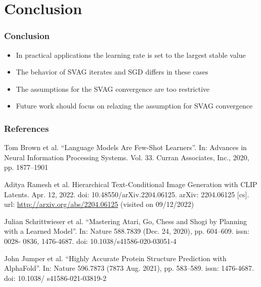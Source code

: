 \documentclass[aspectratio=1610,10pt,ucs]{beamer} %
\begin{document}
\section{Conclusion}
\begin{frame}
  \frametitle{Conclusion}
  \begin{itemize}
    \item In practical applications the learning rate is set to the largest stable value
    \item The behavior of SVAG iterates and SGD differs in these cases
    \item The assumptions for the SVAG convergence are too restrictive
    \item Future work should focus on relaxing the assumption for SVAG convergence
  \end{itemize}
\end{frame}
\begin{frame}
  \frametitle{References}
  
  \begin{thebibliography}{}
  Tom Brown et al. “Language Models Are Few-Shot Learners”. In: Advances in
  Neural Information Processing Systems. Vol. 33. Curran Associates, Inc., 2020,
  pp. 1877–1901

  Aditya Ramesh et al. Hierarchical Text-Conditional Image Generation with CLIP
  Latents. Apr. 12, 2022. doi: 10.48550/arXiv.2204.06125. arXiv: 2204.06125
  [cs]. url: \url{http://arxiv.org/abs/2204.06125} (visited on 09/12/2022)

  Julian Schrittwieser et al. “Mastering Atari, Go, Chess and Shogi by Planning with
a Learned Model”. In: Nature 588.7839 (Dec. 24, 2020), pp. 604–609. issn: 0028-
0836, 1476-4687. doi: 10.1038/s41586-020-03051-4

  John Jumper et al. “Highly Accurate Protein Structure Prediction with AlphaFold”.
  In: Nature 596.7873 (7873 Aug. 2021), pp. 583–589. issn: 1476-4687. doi: 10.1038/
  s41586-021-03819-2

  \end{thebibliography}

\end{frame}
\end{document}
